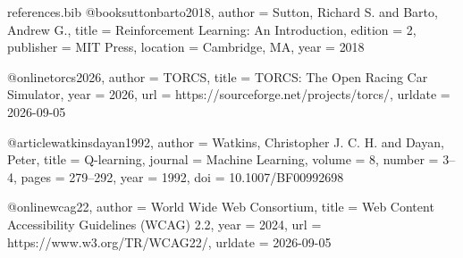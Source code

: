 \begin{filecontents*}{references.bib}
@book{suttonbarto2018,
  author    = {Sutton, Richard S. and Barto, Andrew G.},
  title     = {Reinforcement Learning: An Introduction},
  edition   = {2},
  publisher = {MIT Press},
  location  = {Cambridge, MA},
  year      = {2018}
}

@online{torcs2026,
  author  = {{TORCS}},
  title   = {{TORCS}: The Open Racing Car Simulator},
  year    = {2026},
  url     = {https://sourceforge.net/projects/torcs/},
  urldate = {2026-09-05}
}

@article{watkinsdayan1992,
  author  = {Watkins, Christopher J. C. H. and Dayan, Peter},
  title   = {Q-learning},
  journal = {Machine Learning},
  volume  = {8},
  number  = {3--4},
  pages   = {279--292},
  year    = {1992},
  doi     = {10.1007/BF00992698}
}

@online{wcag22,
  author  = {{World Wide Web Consortium}},
  title   = {Web Content Accessibility Guidelines ({WCAG}) 2.2},
  year    = {2024},
  url     = {https://www.w3.org/TR/WCAG22/},
  urldate = {2026-09-05}
}

\end{filecontents*}

\documentclass[12pt,a4paper]{article}

\usepackage[T1]{fontenc}
\usepackage[utf8]{inputenc}
\usepackage{lmodern}
\usepackage{microtype}
\usepackage[a4paper,margin=25mm]{geometry}
\usepackage{setspace}
\usepackage{graphicx}
\usepackage{booktabs}
\usepackage{tabularx}
\usepackage{array}
\usepackage{amsmath}
\usepackage{enumitem}
\usepackage{csquotes}
\usepackage{titlesec}
\usepackage{hyperref}
\usepackage[nameinlink,noabbrev]{cleveref}
\usepackage[backend=biber,style=authoryear,sorting=nyt,maxcitenames=3,mincitenames=1,giveninits=true]{biblatex}

